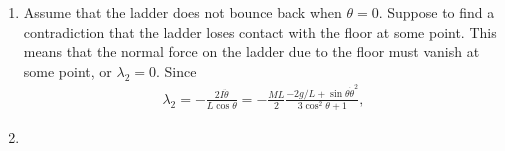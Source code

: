 \documentclass{article}
\theoremstyle{definition}
\newcommand{\f}[2]{\frac{#1}{#2}}
\begin{document}
\begin{enumerate}[label = (\alph*)]
		
		\item Assume that the ladder does not bounce back when $\theta = 0$. Suppose to find a contradiction that the ladder loses contact with the floor at some point. This means that the normal force on the ladder due to the floor must vanish at some point, or $\lambda_2 = 0$. Since 
		\begin{align*}
		\lambda_2 = -\f{2I\ddot\theta}{L\cos\theta} = -\f{ML}{2}\f{-2g/L + \sin\theta \dot\theta^2}{3\cos^2\theta+1},
		\end{align*} 
		\item  
	\end{enumerate} 
	
	
	
\end{document}
